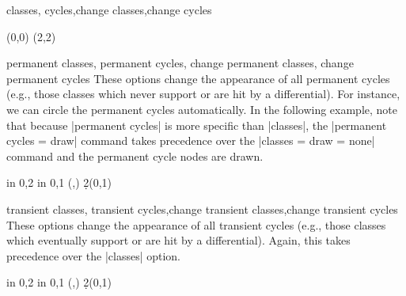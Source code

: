 \begin{sseqdata}[|| name = ex1, cohomological Serre grading]
\begin{stylekeylist}{classes, cycles,change classes,change cycles}
\begin{codeexample}[width = 6cm]
\begin{sseqpage}[ classes = { blue, fill, minimum width = 0.5em },
                  scale = 0.5, x tick step = 2, y tick step = 2 ]
\class(0,0)
\class(2,2)
\end{sseqpage}
\end{codeexample}
\end{stylekeylist}


\begin{stylekeylist}{permanent classes, permanent cycles, change permanent classes, change permanent cycles}
These options change the appearance of all permanent cycles (e.g., those classes which never support or are hit by a differential). For instance, we can circle the permanent cycles automatically. In the following example, note that because |permanent cycles| is more specific than |classes|, the |permanent cycles = {draw}| command takes precedence over the |classes = {draw = none}| command and the permanent cycle nodes are drawn.
\begin{codeexample}[width = 6.5cm]
\begin{sseqpage}[ cohomological Serre grading,
                  classes = { draw = none },
                  permanent cycles = {draw} ]
\foreach \x in {0,2} \foreach \y in {0,1} {
    \class["\mathbb{Z}"](\x,\y)
}
\d2(0,1)
\end{sseqpage}
\end{codeexample}
\end{stylekeylist}

\begin{stylekeylist}{transient classes, transient cycles,change transient classes,change transient cycles}
These options change the appearance of all transient cycles (e.g., those classes which eventually support or are hit by a differential). Again, this takes precedence over the |classes| option.
\begin{codeexample}[width = 6.5cm]
\begin{sseqpage}[ cohomological Serre grading,
                  classes = { draw = none },
                  transient cycles = red ]
\foreach \x in {0,2} \foreach \y in {0,1} {
    \class["\mathbb{Z}"](\x,\y)
}
\d2(0,1)
\end{sseqpage}
\end{codeexample}
\end{stylekeylist}


\end{sseqdata}
